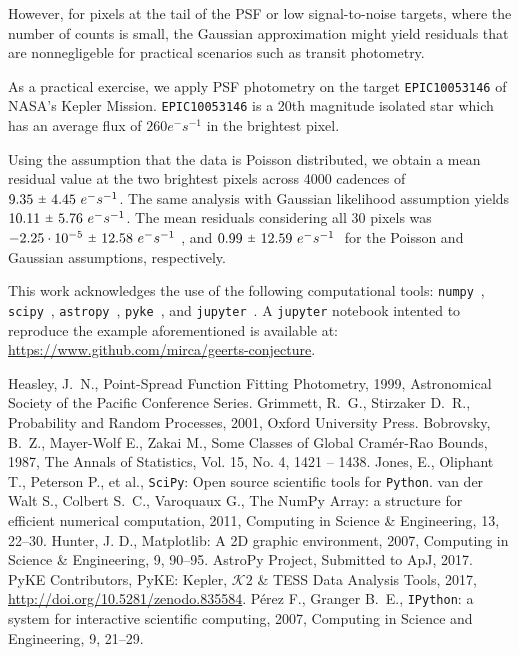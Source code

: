 \documentclass{rnaastex}
\newcommand{\rpm}{\sbox0{$1$}\sbox2{$\scriptstyle\pm$}
\raise\dimexpr(\ht0-\ht2)/2\relax\box2 }
\begin{document}
However, for pixels at the tail of the PSF or low signal-to-noise targets,
where the number of counts is small, the Gaussian approximation might
yield residuals that are nonnegligeble for practical scenarios such as transit
photometry.

As a practical exercise, we apply PSF photometry on the target
\texttt{EPIC10053146} of NASA's Kepler Mission. \texttt{EPIC10053146} is a
20th magnitude isolated star which has an average flux of $260 e^{-}s^{-1}$ in
the brightest pixel.

Using the assumption that the data is Poisson distributed, we obtain a mean
residual value at the two brightest pixels across 4000 cadences of
$9.35~\rpm~4.45~e^{-}s^{-1}$. The same analysis with Gaussian likelihood
assumption yields $10.11~\rpm~5.76~e^{-}s^{-1}$. The mean residuals
considering all 30 pixels was $-2.25\cdot 10^{-5}~\rpm~12.58~e^{-}s^{-1}~$,
and $0.99~\rpm~12.59~e^{-}s^{-1}~$ for the Poisson and Gaussian assumptions,
respectively.

\acknowledgments This work acknowledges the use of the following computational
tools: \texttt{numpy}~\citep{numpy}, \texttt{scipy}~\citep{scipy},
\texttt{astropy}~\citep{astropy}, \texttt{pyke}~\citep{pyke},
and \texttt{jupyter}~\citep{jupyter}.
A \texttt{jupyter} notebook intented to reproduce the example aforementioned is
available at: \url{https://www.github.com/mirca/geerts-conjecture}.

\begin{thebibliography}{}
     Heasley, J.~N., Point-Spread Function
        Fitting Photometry, 1999, Astronomical Society of the Pacific Conference Series.
     Grimmett, R.~G.,
        Stirzaker D.~R., Probability and Random Processes, 2001, Oxford University Press.
     Bobrovsky, B.~Z.,
        Mayer-Wolf E., Zakai M., Some Classes of Global Cram\'er-Rao Bounds, 1987,
        The Annals of Statistics, Vol. 15, No. 4, 1421 -- 1438.
     Jones, E., Oliphant T.,
        Peterson P., et al., \texttt{SciPy}: Open source scientific tools
        for \texttt{Python}.
     van der Walt S., Colbert S.~C.,
        Varoquaux G., The NumPy Array: a structure for efficient numerical
        computation, 2011, Computing in Science \& Engineering, 13, 22--30.
     Hunter, J. D., Matplotlib: A 2D graphic
        environment, 2007, Computing in Science \& Engineering, 9, 90--95.
     AstroPy Project, Submitted to ApJ, 2017.
     PyKE Contributors, PyKE: Kepler,
        $\mathcal{K}\mathit{2}$ \& TESS Data Analysis Tools, 2017,
        \url{http://doi.org/10.5281/zenodo.835584}.
     P\'erez F., Granger B.~E.,
        \texttt{IPython}: a system for interactive scientific computing, 2007,
        Computing in Science and Engineering, 9, 21--29.
\end{thebibliography}
\end{document}
